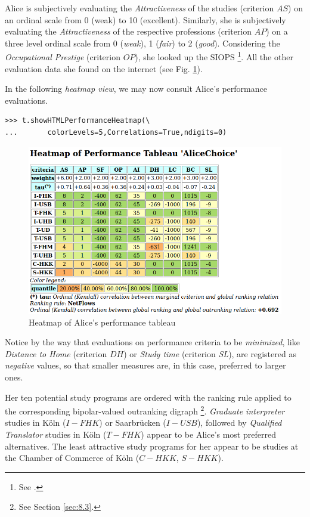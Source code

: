 Alice is subjectively evaluating the \emph{Attractiveness} of the studies (criterion $AS$) on an ordinal scale from 0 (weak) to 10 (excellent). Similarly, she is subjectively evaluating the \emph{Attractiveness} of the respective professions (criterion $AP$) on a three level ordinal scale from 0 (\emph{weak}), 1 (\emph{fair}) to 2 (\emph{good}). Considering the \emph{Occupational Prestige} (criterion $OP$), she looked up the SIOPS \footnote{See \citet*{GAN-1996}.}. All the other evaluation data she found on the internet (see Fig. \ref{fig:12.3}).

In the following \emph{heatmap view}, we may now consult Alice's performance evaluations.

\begin{lstlisting}
>>> t.showHTMLPerformanceHeatmap(\
...       colorLevels=5,Correlations=True,ndigits=0)
\end{lstlisting}
\begin{figure}[h]
\includegraphics[width=12cm]{Figures/aliceHeatmap.png}
\caption{Heatmap of Alice's performance tableau}
\label{fig:12.3}       %
\end{figure}

Notice by the way that evaluations on performance criteria to be \emph{minimized}, like \emph{Distance to Home} (criterion $DH$) or \emph{Study time} (criterion \emph{SL}), are registered as \emph{negative} values, so that smaller measures are, in this case, preferred to larger ones.

Her ten potential study programs are ordered with the \NetFlows ranking rule applied to the corresponding bipolar-valued outranking digraph \footnote{See Section \ref{sec:8.3}.}. \emph{Graduate interpreter} studies in Köln ($I-FHK$) or Saarbrücken ($I-USB$), followed by \emph{Qualified Translator} studies in Köln ($T-FHK$) appear to be Alice's most preferred alternatives. The least attractive study programs for her appear to be studies at the Chamber of Commerce of Köln ($C-HKK$, $S-HKK$).

